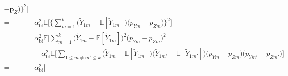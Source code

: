 \documentclass[twoside,11pt]{article}
\newcommand{\rvTwo}{Y}
\newcommand{\rvThree}{Z}
\newcommand{\private}[1]{\tilde{#1}}
\newcommand{\mE}{\mathbb{E}} %
\newcommand{\alphabetSize}{k} %
\newcommand{\vectorIndex}{m}
\newcommand{\probVecElement}[2]{p_{{#1}{#2}}}
\newcommand{\probVec}{\mathbf{p}} %
\newcommand{\privacyParameter}{\alpha} %
\newcommand{\privacyParameterrappor}{\privacyParameter_{\mathrm{bf}}}
\begin{document}
\begin{appendix}
\begin{itemize}
\begin{align*}
		- %
		\probVec_{\rvThree}
		\bigr) %
		\bigr\}^2 %
		\Bigr] %
		\\= ~&
		\privacyParameterrappor^2
		\mE %
		\biggl[ %
		\biggl\{ %
		\sum_{\vectorIndex=1}^\alphabetSize
		\bigl( %
		\private{\rvTwo}_{1 \vectorIndex}
		- %
		\mE [ \private{\rvTwo}_{1 \vectorIndex}]
		\bigr) %
		\bigl( %
		\probVecElement{\rvTwo}{\vectorIndex}
		- %
		\probVecElement{\rvThree}{\vectorIndex}
		\bigr) %
		\biggr\}^2 %
		\biggr] %
		\\= ~&
		\privacyParameterrappor^2
		\mE %
		\biggl[ %
		\sum_{\vectorIndex=1}^\alphabetSize
		\bigl( %
		\private{\rvTwo}_{1 \vectorIndex}
		- %
		\mE [ \private{\rvTwo}_{1 \vectorIndex}]
		\bigr)^2 %
		\bigl( %
		\probVecElement{\rvTwo}{\vectorIndex}
		- %
		\probVecElement{\rvThree}{\vectorIndex}
		\bigr)^2 %
		\biggr] %
		\\ &+~
		\privacyParameterrappor^2
		\mE 
		\biggl[ %
		\sum_{1 \leq \vectorIndex \neq \vectorIndex' \leq \alphabetSize}
		\bigl( %
		\private{\rvTwo}_{1 \vectorIndex}
		- %
		\mE [ \private{\rvTwo}_{1 \vectorIndex}]
		\bigr) %
		\bigl( %
		\private{\rvTwo}_{1 \vectorIndex'}
		- %
		\mE [ \private{\rvTwo}_{1 \vectorIndex'}]
		\bigr) %
		\bigl( %
		\probVecElement{\rvTwo}{\vectorIndex}
		- %
		\probVecElement{\rvThree}{\vectorIndex}
		\bigr) %
		\bigl( %
		\probVecElement{\rvTwo}{\vectorIndex'}
		- %
		\probVecElement{\rvThree}{\vectorIndex'}
		\bigr) %
		\biggr] %
		\\= ~&%
		\privacyParameterrappor^2
		\biggl[ %

\end{align*}
\end{itemize}
\end{appendix}
\end{document}

